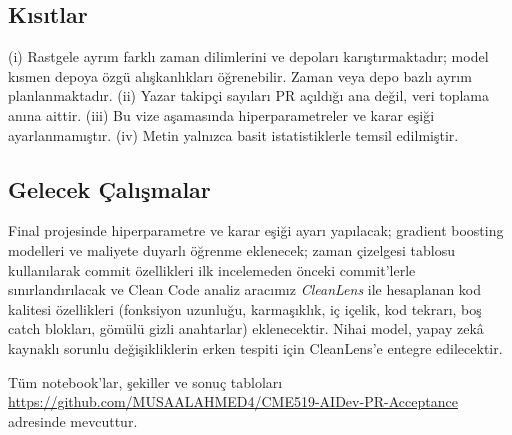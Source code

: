 \documentclass[conference]{IEEEtran}
\begin{document}
\subsection{Kısıtlar}
(i) Rastgele ayrım farklı zaman dilimlerini ve depoları karıştırmaktadır; model kısmen depoya özgü alışkanlıkları öğrenebilir. Zaman veya depo bazlı ayrım planlanmaktadır. (ii) Yazar takipçi sayıları PR açıldığı ana değil, veri toplama anına aittir. (iii) Bu vize aşamasında hiperparametreler ve karar eşiği ayarlanmamıştır. (iv) Metin yalnızca basit istatistiklerle temsil edilmiştir.

\subsection{Gelecek Çalışmalar}
Final projesinde hiperparametre ve karar eşiği ayarı yapılacak; gradient boosting modelleri ve maliyete duyarlı öğrenme eklenecek; zaman çizelgesi tablosu kullanılarak commit özellikleri ilk incelemeden önceki commit'lerle sınırlandırılacak ve Clean Code analiz aracımız \textit{CleanLens} ile hesaplanan kod kalitesi özellikleri (fonksiyon uzunluğu, karmaşıklık, iç içelik, kod tekrarı, boş catch blokları, gömülü gizli anahtarlar) eklenecektir. Nihai model, yapay zekâ kaynaklı sorunlu değişikliklerin erken tespiti için CleanLens'e entegre edilecektir.

Tüm notebook'lar, şekiller ve sonuç tabloları \url{https://github.com/MUSAALAHMED4/CME519-AIDev-PR-Acceptance} adresinde mevcuttur.
\end{document}

